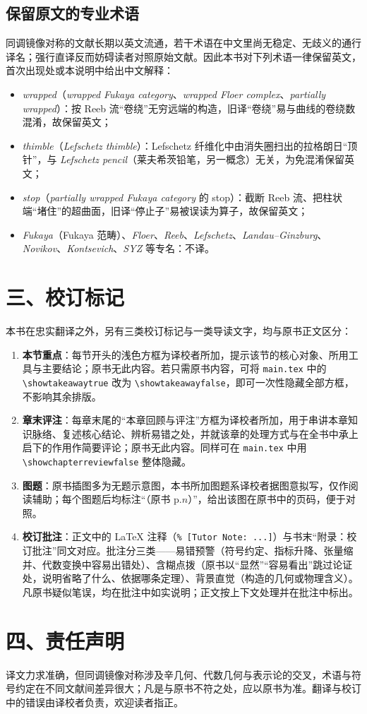 \subsection*{保留原文的专业术语}
同调镜像对称的文献长期以英文流通，若干术语在中文里尚无稳定、无歧义的通行译名；强行直译反而妨碍读者对照原始文献。因此本书对下列术语一律保留英文，首次出现处或本说明中给出中文解释：
\begin{itemize}
  \item \textit{wrapped}（\textit{wrapped Fukaya category}、\textit{wrapped Floer complex}、\textit{partially wrapped}）：按 Reeb 流“卷绕”无穷远端的构造，旧译“卷绕”易与曲线的卷绕数混淆，故保留英文；
  \item \textit{thimble}（\textit{Lefschetz thimble}）：Lefschetz 纤维化中由消失圈扫出的拉格朗日“顶针”，与 \textit{Lefschetz pencil}（莱夫希茨铅笔，另一概念）无关，为免混淆保留英文；
  \item \textit{stop}（\textit{partially wrapped Fukaya category} 的 stop）：截断 Reeb 流、把柱状端“堵住”的超曲面，旧译“停止子”易被误读为算子，故保留英文；
  \item \textit{Fukaya}（Fukaya 范畴）、\textit{Floer}、\textit{Reeb}、\textit{Lefschetz}、\textit{Landau--Ginzburg}、\textit{Novikov}、\textit{Kontsevich}、\textit{SYZ} 等专名：不译。
\end{itemize}

\section*{三、校订标记}
本书在忠实翻译之外，另有三类校订标记与一类导读文字，均与原书正文区分：
\begin{enumerate}
  \item \textbf{本节重点}：每节开头的浅色方框为译校者所加，提示该节的核心对象、所用工具与主要结论；原书无此内容。若只需原书内容，可将 \texttt{main.tex} 中的 \verb|\showtakeawaytrue| 改为 \verb|\showtakeawayfalse|，即可一次性隐藏全部方框，不影响其余排版。
  \item \textbf{章末评注}：每章末尾的“本章回顾与评注”方框为译校者所加，用于串讲本章知识脉络、复述核心结论、辨析易错之处，并就该章的处理方式与在全书中承上启下的作用作简要评论；原书无此内容。同样可在 \texttt{main.tex} 中用 \verb|\showchapterreviewfalse| 整体隐藏。
  \item \textbf{图题}：原书插图多为无题示意图，本书所加图题系译校者据图意拟写，仅作阅读辅助；每个图题后均标注“（原书 p.$n$）”，给出该图在原书中的页码，便于对照。
  \item \textbf{校订批注}：正文中的 LaTeX 注释（\verb|% [Tutor Note: ...]|）与书末“附录：校订批注”同文对应。批注分三类——易错预警（符号约定、指标升降、张量缩并、代数变换中容易出错处）、含糊点拨（原书以“显然”“容易看出”跳过论证处，说明省略了什么、依据哪条定理）、背景直觉（构造的几何或物理含义）。凡原书疑似笔误，均在批注中如实说明；正文按上下文处理并在批注中标出。
\end{enumerate}

\section*{四、责任声明}
译文力求准确，但同调镜像对称涉及辛几何、代数几何与表示论的交叉，术语与符号约定在不同文献间差异很大；凡是与原书不符之处，应以原书为准。翻译与校订中的错误由译校者负责，欢迎读者指正。
